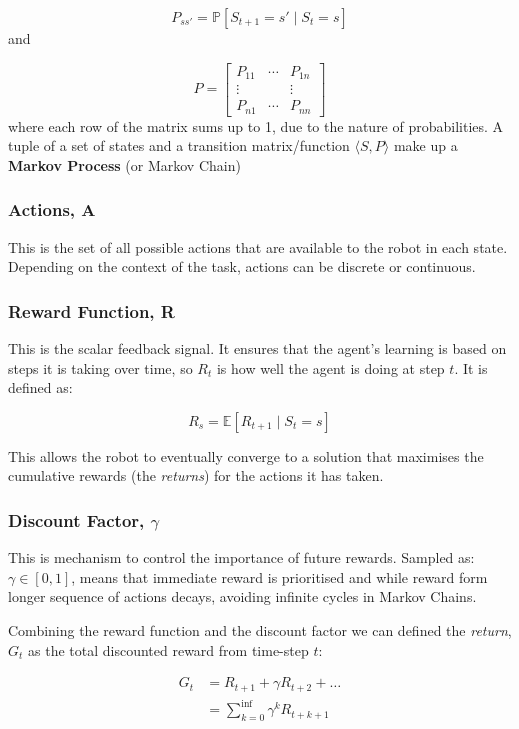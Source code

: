     \[ P_{ss'} = \mathbb{P} \left[S_{t+1} = s'  \mid S_t = s\right]\] 
    and 
    
    \[ P =
    \begin{bmatrix}
      P_{11} & \cdots & P_{1n} \\ 
      \vdots & & \vdots\\
      P_{n1} & \cdots & P_{nn}
    \end{bmatrix}
    \]
    where each row of the matrix sums up to 1, due to the nature of probabilities. A tuple of a set of states and a transition matrix/function \(\langle S, P \rangle\) make up a \textbf{Markov Process} (or Markov Chain)

  \subsubsection{Actions, A}
    This is the set of all possible actions that are available to the robot in each state. Depending on the context of the task, actions can be discrete or continuous.

  \subsubsection{Reward Function, R}
    This is the scalar feedback signal. It ensures that the agent's learning is based on steps it is taking over time, so $R_t$ is how well the agent is doing at step $t$. It is defined as:

    \[R_s = \mathbb{E} \left[R_{t+1} \mid S_t = s\right]\]
    
    This allows the robot to eventually converge to a solution that maximises the cumulative rewards (the \emph{returns}) for the actions it has taken. 
  
  \subsubsection{Discount Factor, $\gamma$}
    This is mechanism to control the importance of future rewards. Sampled as: \(\gamma \in \left[0, 1\right]\), means that immediate reward is prioritised and while reward form longer sequence of actions decays, avoiding infinite cycles in Markov Chains.

    Combining the reward function and the discount factor we can defined the \emph{return}, $G_t$ as the total discounted reward from time-step $t$:

    \[ 
    \begin{aligned}
      G_t &= R_{t+1} + \gamma R_{t+2} + \ldots \\ 
      &= \sum_{k=0}^{\inf}\gamma^k R_{t+k+1} 
    \end{aligned}
    \]
    
